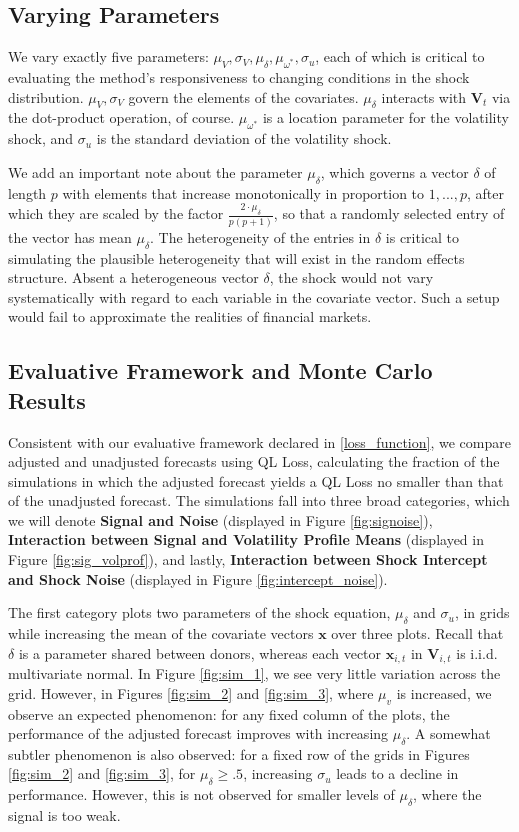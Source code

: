 \documentclass{uiucthesis2021}
\newcommand{\V}{\textbf{V}}
\newcommand{\x}{\textbf{x}}
\theoremstyle{definition}
\begin{document}
  \subsection{Varying Parameters}
  We vary exactly five parameters: $\mu_{V}, \sigma_{V}, \mu_{\delta}, \mu_{\omega^{*}}, \sigma_{u}$, each of which is critical to evaluating the method's responsiveness to changing conditions in the shock distribution. $\mu_{V}, \sigma_{V}$ govern the elements of the covariates. $\mu_{\delta}$ interacts with $\textbf{V}_{t}$ via the dot-product operation, of course.  $\mu_{\omega^{*}}$ is a location parameter for the volatility shock, and $\sigma_{u}$ is the standard deviation of the volatility shock.
  
  We add an important note about the parameter $\mu_{\delta}$, which governs a vector $\delta$ of length $p$ with elements that increase monotonically in proportion to $1,...,p$, after which they are scaled by the factor $\frac{2\cdot\mu_{\delta}}{p(p+1)}$, so that a randomly selected entry of the vector has mean $\mu_{\delta}$.  The heterogeneity of the entries in $\delta$ is critical to simulating the plausible heterogeneity that will exist in the random effects structure.  Absent a heterogeneous vector $\delta$, the shock would not vary systematically with regard to each variable in the covariate vector.  Such a setup would fail to approximate the realities of financial markets.

\subsection{Evaluative Framework and Monte Carlo Results}
Consistent with our evaluative framework declared in \ref{loss_function}, we compare adjusted and unadjusted forecasts using QL Loss, calculating the fraction of the simulations in which the adjusted forecast yields a QL Loss no smaller than that of the unadjusted forecast.  The simulations fall into three broad categories, which we will denote \textbf{Signal and Noise} (displayed in Figure \ref{fig:signoise}), \textbf{Interaction between Signal and Volatility Profile Means} (displayed in Figure \ref{fig:sig_volprof}), and lastly, \textbf{Interaction between Shock Intercept and Shock Noise} (displayed in Figure \ref{fig:intercept_noise}).  

The first category plots two parameters of the shock equation, $\mu_{\delta}$ and $\sigma_{u}$, in grids while increasing the mean of the covariate vectors $\x$ over three plots.  Recall that $\delta$ is a parameter shared between donors, whereas each vector $\x_{i,t}$ in $\V_{i,t}$ is i.i.d. multivariate normal.  In Figure \ref{fig:sim_1}, we see very little variation across the grid.  However, in Figures \ref{fig:sim_2} and \ref{fig:sim_3}, where $\mu_{v}$ is increased, we observe an expected phenomenon: for any fixed column of the plots, the performance of the adjusted forecast improves with increasing $\mu_{\delta}$.  A somewhat subtler phenomenon is also observed: for a fixed row of the grids in Figures \ref{fig:sim_2} and \ref{fig:sim_3}, for $\mu_{\delta} \geq .5$, increasing $\sigma_{u}$ leads to a decline in performance.  However, this is not observed for smaller levels of $\mu_{\delta}$, where the signal is too weak.
\end{document}
